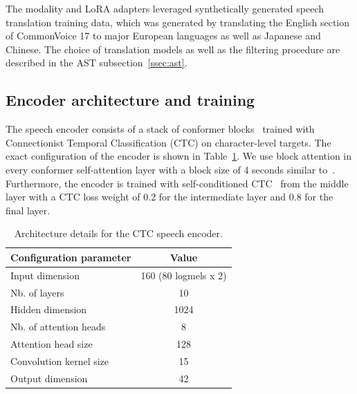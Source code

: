 \documentclass[9pt,conference]{IEEEtran}
\begin{document}
The modality and LoRA adapters leveraged synthetically generated speech translation training data, which was generated by translating the English section of CommonVoice 17 to major European languages as well as Japanese and Chinese. The choice of translation models as well as the filtering procedure are described in the AST subsection~\ref{ssec:ast}.

\subsection{Encoder architecture and training}
\label{ssec:encoder}

The speech encoder consists of a stack of conformer blocks~\cite{gulati2020conformer} trained with Connectionist Temporal Classification (CTC) on character-level targets. The exact configuration of the encoder is shown in Table~\ref{ctc-arch}. We use block attention in every conformer self-attention layer with a block size of 4 seconds similar to~\cite{zhang2023google}. Furthermore, the encoder is trained with self-conditioned CTC~\cite{nozaki2021relaxing} from the middle layer with a CTC loss weight of 0.2 for the intermediate layer and 0.8 for the final layer. 

\begin{table}[htb]
\begin{center}
\begin{tabular}{|l|c|} \hline
Configuration parameter & Value\\ \hline
Input dimension & 160 (80 logmels x 2) \\ \hline
Nb. of layers   & 10                   \\ \hline
Hidden dimension & 1024                \\ \hline
Nb. of attention heads & 8             \\ \hline
Attention head size    & 128           \\ \hline
Convolution kernel size & 15           \\ \hline
Output dimension        & 42           \\ \hline
\end{tabular}
\end{center}
\caption{\label{ctc-arch} Architecture details for the CTC speech encoder.}
\end{table}
\end{document}
